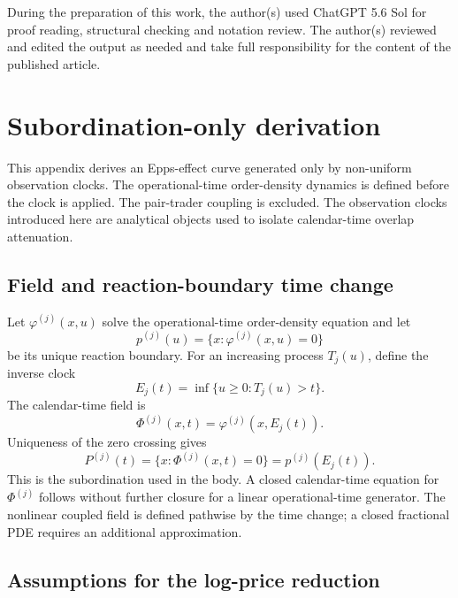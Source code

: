 \documentclass[5p,final]{elsarticle}
\begin{document}
During the preparation of this work, the author(s) used ChatGPT 5.6 Sol for proof reading, structural checking and notation review. The author(s) reviewed and edited the output as needed and take full responsibility for the content of the published article. 



\appendix

\section{Subordination-only derivation}
\label{app:subordination-only}

This appendix derives an Epps-effect curve generated only by non-uniform observation clocks. The operational-time order-density dynamics is defined before the clock is applied. The pair-trader coupling is excluded. The observation clocks introduced here are analytical objects used to isolate calendar-time overlap attenuation. 

\subsection{Field and reaction-boundary time change}

Let $\varphi^{(j)}(x,u)$ solve the operational-time order-density equation and let
\begin{equation}
    p^{(j)}(u)=\{x:\varphi^{(j)}(x,u)=0\}
\end{equation}
be its unique reaction boundary. For an increasing process $T_j(u)$, define the inverse clock
\begin{equation}
    E_j(t)=\inf\{u\geq0:T_j(u)>t\}.
\end{equation}
The calendar-time field is
\begin{equation}
    \Phi^{(j)}(x,t)=\varphi^{(j)}\!\left(x,E_j(t)\right).
\end{equation}
Uniqueness of the zero crossing gives
\begin{equation}
    P^{(j)}(t)=\{x:\Phi^{(j)}(x,t)=0\}=p^{(j)}\!\left(E_j(t)\right).
\end{equation}
This is the subordination used in the body. A closed calendar-time equation for $\Phi^{(j)}$ follows without further closure for a linear operational-time generator. The nonlinear coupled field is defined pathwise by the time change; a closed fractional PDE requires an additional approximation.

\subsection{Assumptions for the log-price reduction}
\end{document}
